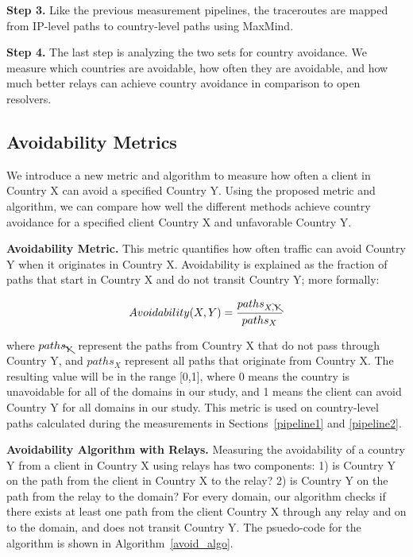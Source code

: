 {\bf Step 3.}  Like the previous measurement pipelines, the traceroutes are mapped from IP-level paths to country-level paths using MaxMind.

{\bf Step 4.}  The last step is analyzing the two sets for country avoidance.  We measure which countries are avoidable, how often they are avoidable, and how much better relays can achieve country avoidance in comparison to open resolvers.

\subsection{Avoidability Metrics}
\label{metrics}
We introduce a new metric and algorithm to measure how often a client in Country X can avoid a specified Country Y.  Using the proposed metric and algorithm, we can compare how well the different methods achieve country avoidance for a specified client Country X and unfavorable Country Y.

{\bf Avoidability Metric.}  This metric quantifies how often traffic can avoid Country Y when it originates in Country X.  Avoidability is explained as the fraction of paths that start in Country X and do not transit Country Y; more formally:

\[Avoidability(X,Y) = \frac{paths_{X,\bcancel{Y}}}{paths_{X}}\]

where $paths_{\bcancel{Y}}$ represent the paths from Country X that do not pass through Country Y, and $paths_{X}$ represent all paths that originate from Country X. The resulting value will be in the range [0,1], where 0 means the country is unavoidable for all of the domains in our study, and 1 means the client can avoid Country Y for all domains in our study.  This metric is used on country-level paths calculated during the measurements in Sections~\ref{pipeline1} and \ref{pipeline2}.  

{\bf Avoidability Algorithm with Relays.}  Measuring the avoidability of a country Y from a client in Country X using relays has two components: 1) is Country Y on the path from the client in Country X to the relay?  2) is Country Y on the path from the relay to the domain?  For every domain, our algorithm checks if there exists at least one path from the client Country X through any relay and on to the domain, and does not transit Country Y.  The psuedo-code for the algorithm is shown in Algorithm~\ref{avoid_algo}.

